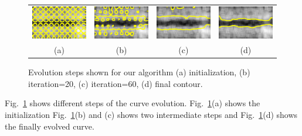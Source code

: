 \begin{figure}[t]
\centering
	\renewcommand{\tabcolsep}{0.05cm}
	\begin{tabular}{@{}cccc@{}}
		\includegraphics[width=.24\linewidth]{./images/DL2S/evolution/cylDPSS_DLevol570} &
		\includegraphics[width=.24\linewidth]{./images/DL2S/evolution/cylDPSS_DLevol5710} &
		\includegraphics[width=.24\linewidth]{./images/DL2S/evolution/cylDPSS_DLevol5720} &
		\includegraphics[width=.24\linewidth]{./images/DL2S/evolution/cylDPSS_DLevol57221} 
		\\
		\scriptsize(a) & \scriptsize (b)&\scriptsize(c)&\scriptsize(d)
	\end{tabular}
\caption[DL2S curve evolution]{Evolution steps shown for our algorithm (a) initialization, (b) iteration=20, (c) iteration=60, (d) final contour.}
\vspace{-0.5cm}
\label{fig:DL2S_curve_evol}
\end{figure}
Fig.~\ref{fig:DL2S_curve_evol} shows different steps of the curve evolution. Fig.~\ref{fig:DL2S_curve_evol}(a) shows the initialization Fig.~\ref{fig:DL2S_curve_evol}(b) and (c) shows two intermediate steps and Fig.~\ref{fig:DL2S_curve_evol}(d) shows the finally evolved curve.

